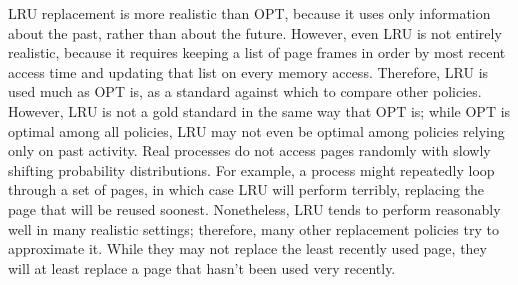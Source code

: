 LRU replacement is more realistic than OPT, because it uses only
information about the past, rather than about the future.  However,
even LRU is not entirely realistic, because it requires keeping a list
of page frames in order by most recent access time and updating that
list on every memory access.  Therefore, LRU is used much as OPT is,
as a standard against which to compare other policies.  However, LRU
is not a gold standard in the same way that OPT is; while OPT is
optimal among all policies, LRU may not even be optimal among policies
relying only on past activity.  Real processes do not access pages
randomly with slowly shifting probability distributions.  For
example, a process might repeatedly loop through a set of pages, in
which case LRU will perform terribly, replacing the page that will be
reused soonest.  Nonetheless, LRU tends to perform reasonably well
in many realistic settings; therefore, many other replacement policies try
to approximate it.  While they may not replace the least recently used
page, they will at least replace a page that hasn't been used very
recently.

